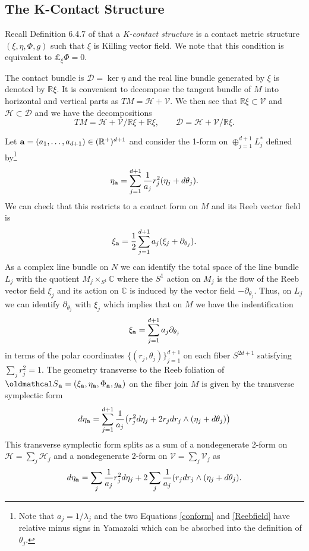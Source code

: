 \documentclass[12pt]{amsart}
\def\bbc{{\mathbb C}}
\def\bbr{{\mathbb R}}
\def\grl{\lambda}
\def\bfa{{\bf a}}
\def\cald{{\mathcal D}}
\def\calh{{\mathcal H}}
\def\cals{{\oldmathcal S}}
\def\calv{{\mathcal V}}
\begin{document}
\subsection{The K-Contact Structure}
Recall Definition 6.4.7 of \cite{BG05} that a {\it K-contact structure} is a contact metric structure $(\xi,\eta,\Phi,g)$ such that $\xi$ is Killing vector field. We note that this condition is equivalent to $\pounds_\xi\Phi=0$.

The contact bundle is $\cald=\ker\eta$ and the real line bundle generated by $\xi$ is denoted by $\bbr\xi$. It is convenient to decompose the tangent bundle of $M$ into horizontal and vertical parts as $TM=\calh + \calv$. We then see that 
$\bbr\xi\subset \calv$ and $\calh\subset \cald$ and we have the decompositions
$$TM=\calh+\calv/\bbr\xi+\bbr\xi,\qquad \cald=\calh+\calv/\bbr\xi.$$

Let $\bfa=(a_1,\ldots,a_{d+1})\in(\bbr^+)^{d+1}$ and consider the 1-form on $\oplus_{j=1}^{d+1}L^*_j$ defined by\footnote{Note that $a_j=1/\grl_j$ and the two Equations \eqref{conform} and \eqref{Reebfield} have relative minus signs in Yamazaki which can be absorbed into the definition of $\theta_j$.}
\begin{equation}\label{conform}
\eta_\bfa=\sum_{j=1}^{d+1}\frac{1}{a_j}r_j^2(\eta_j+d\theta_j).
\end{equation}
We can check that this restricts to a contact form on $M$ and its Reeb vector field is
\begin{equation}\label{Reebfield}
\xi_\bfa=\frac{1}{2}\sum_{j=1}^{d+1}a_j(\xi_j+\partial_{\theta_j}).
\end{equation}
As a complex line bundle on $N$ we can identify the total space of the line bundle $L_j$ with the quotient $M_j\times_{S^1}\bbc$ where the $S^1$ action on $M_j$ is the flow of the Reeb vector field $\xi_j$ and its action on $\bbc$ is induced by the vector field $-\partial_{\theta_j}$. Thus, on $L_j$ we can identify $\partial_{\theta_j}$ with $\xi_j$ which implies that on $M$ we have the indentification
$$\xi_\bfa=\sum_{j=1}^{d+1}a_j\partial_{\theta_j}$$
in terms of the polar coordinates $\{(r_j,\theta_j)\}_{j=1}^{d+1}$ on each fiber $S^{2d+1}$ satisfying $\sum_jr_j^2=1$. 
The geometry transverse to the Reeb foliation of $\cals_\bfa=(\xi_\bfa,\eta_\bfa,\Phi_\bfa,g_\bfa)$ on the fiber join $M$ is given by the transverse symplectic form
\begin{equation}\label{transsympl}
d\eta_\bfa=\sum_{j=1}^{d+1}\frac{1}{a_j}\bigl(r_j^2d\eta_j +2r_jdr_j\wedge(\eta_j+d\theta_j)\bigr)
\end{equation}
This transverse symplectic form splits as a sum of a nondegenerate 2-form on $\calh=\sum_j\calh_j$ and a nondegenerate 2-form on $\calv=\sum_j\calv_j$ as
\begin{equation}\label{sumsymp}
d\eta_\bfa= \sum_j\frac{1}{a_j}r_j^2d\eta_j + 2\sum_j\frac{1}{a_j}(r_jdr_j\wedge (\eta_j+d\theta_j).
\end{equation} 
\end{document}
